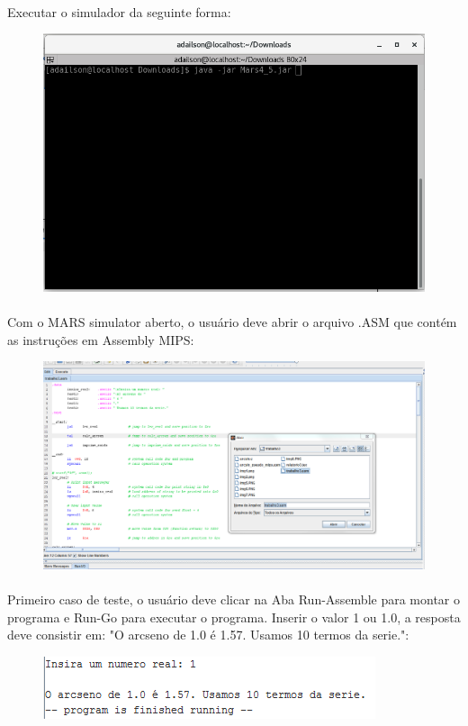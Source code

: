 \documentclass[a4paper, 12pt]{article}
\begin{document}
		\paragraph{}    Executar o simulador da seguinte forma:
		\begin{figure}[H]
			\centering
			\includegraphics[scale=0.5]{img2.png}
		\end{figure}
        \paragraph{}    Com o MARS simulator aberto, o usu\'ario deve abrir o arquivo .ASM que cont\'em as instru\c{c}\~oes em Assembly MIPS:
        \begin{figure}[H]
        	\centering
        	\includegraphics[scale=0.3]{img3.png}
        \end{figure}
        \paragraph{}    Primeiro caso de teste, o usu\'ario deve clicar na Aba Run-Assemble para montar o programa e Run-Go para executar o programa. Inserir o valor 1 ou 1.0, a resposta deve consistir em: "O arcseno de 1.0 \'e 1.57. Usamos 10 termos da serie.":
        \begin{figure}[H]
        	\centering
        	\includegraphics[scale=0.5]{img5.png}
        \end{figure}
\end{document}
